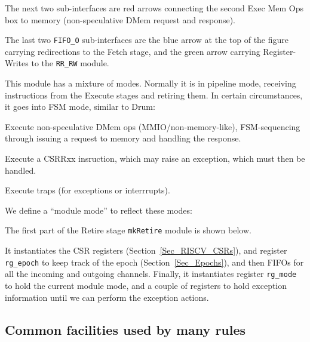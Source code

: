 The next two sub-interfaces are red arrows connecting the second Exec
Mem Ops box to memory (non-speculative DMem request and response).

The last two \verb|FIFO_O| sub-interfaces are the blue arrow at the
top of the figure carrying redirections to the Fetch stage, and the
green arrow carrying Register-Writes to the \verb|RR_RW| module.

This module has a mixture of modes.  Normally it is in pipeline mode,
receiving instructions from the Execute stages and retiring them.  In
certain circumstances, it goes into FSM mode, similar to Drum:

\begin{tightlist}

 \item Execute non-speculative DMem ops (MMIO/non-memory-like),
        FSM-sequencing through issuing a request to memory and
        handling the response.

 \item Execute a CSRRxx insruction, which may raise an exception,
       which must then be handled.

 \item Execute traps (for exceptions or interrrupts).

\end{tightlist}

We define a ``module mode'' to reflect these modes:


The first part of the Retire stage \verb|mkRetire| module is shown below.


It instantiates the CSR registers (Section~\ref{Sec_RISCV_CSRs}), and
register \verb|rg_epoch| to keep track of the epoch
(Section~\ref{Sec_Epochs}), and then FIFOs for all the incoming and
outgoing channels.  Finally, it instantiates register \verb|rg_mode|
to hold the current module mode, and a couple of registers to hold
exception information until we can perform the exception actions.


\subsection{Common facilities used by many rules}

\label{Sec_Retire_Common}

